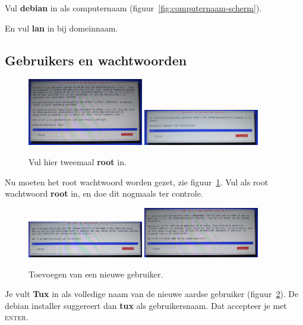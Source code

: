 \documentclass[12pt,a4paper]{article}
\begin{document}
Vul \textbf{debian} in als computernaam (figuur~\ref{fig:computernaam-scherm}).

En vul \textbf{lan} in bij domeinnaam.


\subsection{Gebruikers en wachtwoorden}

\begin{figure}[H]
\centering
\includegraphics[width=0.45\textwidth]{root-wachtwoord-scherm}
\includegraphics[width=0.45\textwidth]{root-wachtwoord-bevestiging}
\caption{Vul hier tweemaal \textbf{root} in.}
\label{fig:root-wachtwoord-scherm}
\end{figure}

Nu moeten het root wachtwoord worden gezet, zie figuur~\ref{fig:root-wachtwoord-scherm}.
Vul als root wachtwoord \textbf{root} in, en doe dit nogmaals ter controle.

\begin{figure}[H]
\centering
\includegraphics[width=0.45\textwidth]{nieuwe-gebruiker-naam}
\includegraphics[width=0.45\textwidth]{nieuwe-gebruiker-echte-naam}
\caption{Toevoegen van een nieuwe gebruiker.}
\label{fig:nieuwe-gebruiker}
\end{figure}

Je vult \textbf{Tux} in als volledige naam van de nieuwe aardse gebruiker (figuur~\ref{fig:nieuwe-gebruiker}).
De debian installer suggereert dan \textbf{tux} als gebruikersnaam.
Dat accepteer je met \textsc{enter}.
\end{document}
